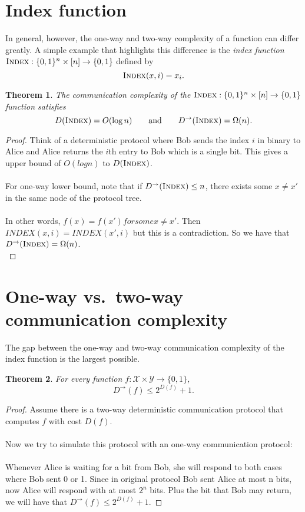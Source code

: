 \documentclass[11pt,oneside]{book}
\theoremstyle{plain}
\newtheorem{theorem}{Theorem}
\theoremstyle{definition}
\theoremstyle{plain}
\newcommand{\calX}{\mathcal{X}}
\newcommand{\calY}{\mathcal{Y}}
\newcommand{\Index}{\textsc{Index}}
\begin{document}
 
\section{Index function}

In general, however, the one-way and two-way complexity of a function can differ greatly. A simple example that highlights this difference is the \emph{index function} $\Index : \{0,1\}^n \times [n] \to \{0,1\}$ defined by
\[
\Index(x,i) = x_i.
\]

\begin{theorem}
	The communication complexity of the $\Index : \{0,1\}^n \times [n] \to \{0,1\}$ function satisfies
	\[
	D(\Index) = O(\log n) \qquad \mbox{and} \qquad D^\rightarrow(\Index) = \Omega(n).
	\]
\end{theorem}

\begin{proof}
	Think of a deterministic protocol where Bob sends the index $i$ in binary to Alice and Alice returns the $i$th entry to Bob which is a single bit. This gives a upper bound of $O(logn)$ to $D(\Index)$.\\
	\\
	For one-way lower bound, note that if $D^\rightarrow(\Index) \leq n$, there exists some $x \neq x'$ in the same node of the protocol tree. \\
	 \\
	In other words, $f(x)=f(x') for some x\neq x'$. Then $INDEX(x,i)=INDEX(x',i)$ but this is a contradiction. So we have that $D^\rightarrow(\Index) = \Omega(n)$.\\
\end{proof}



 
\section{One-way vs.~two-way communication complexity}

The gap between the one-way and two-way communication complexity of the index function is the largest possible.

\begin{theorem}
	For every function $f : \calX \times \calY \to \{0,1\}$,
	\[
	D^\rightarrow(f) \le 2^{D(f)}+1.
	\]
\end{theorem}

\begin{proof}
	Assume there is a two-way deterministic communication protocol that computes $f$ with cost $D(f)$. \\
	\\
	Now we try to simulate this protocol with an one-way communication protocol: \\
	\\
	Whenever Alice is waiting for a bit from Bob, she will respond to both cases where Bob sent 0 or 1. Since in original protocol Bob sent Alice at most n bits, now Alice will respond with at most $2^n$ bits. Plus the bit that Bob may return, we will have that $D^\rightarrow(f) \le 2^{D(f)}+1$.
\end{proof}
\end{document}
